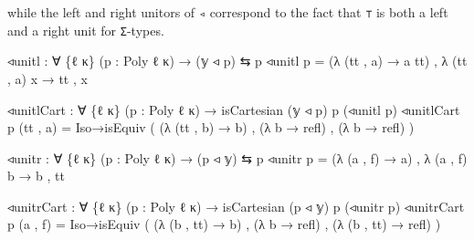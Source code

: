 \documentclass[
  11pt,
  oneside,
  article]{memoir}
\newenvironment{Shaded}{}{}
\newcommand{\NormalTok}[1]{#1}
\newcommand{\OtherTok}[1]{\textcolor[rgb]{0.00,0.44,0.13}{#1}}
\theoremstyle{definition}
\theoremstyle{plain}
\newcommand{\0}{\textsf{0}}
\newcommand{\1}{\tn{\textsf{1}}}
\begin{document}
while the left and right unitors of \texttt{◃} correspond to the fact
that \texttt{⊤} is both a left and a right unit for \texttt{Σ}-types.

\begin{Shaded}
\begin{Highlighting}[]
\NormalTok{◃unitl }\OtherTok{:} \OtherTok{∀} \OtherTok{\{}\NormalTok{ℓ κ}\OtherTok{\}} \OtherTok{(}\NormalTok{p }\OtherTok{:}\NormalTok{ Poly ℓ κ}\OtherTok{)} \OtherTok{→} \OtherTok{(}\NormalTok{𝕪 ◃ p}\OtherTok{)}\NormalTok{ ⇆ p}
\NormalTok{◃unitl p }\OtherTok{=} \OtherTok{(λ} \OtherTok{(}\NormalTok{tt , a}\OtherTok{)} \OtherTok{→}\NormalTok{ a tt}\OtherTok{)}\NormalTok{ , }\OtherTok{λ} \OtherTok{(}\NormalTok{tt , a}\OtherTok{)}\NormalTok{ x }\OtherTok{→}\NormalTok{ tt , x}

\NormalTok{◃unitlCart }\OtherTok{:} \OtherTok{∀} \OtherTok{\{}\NormalTok{ℓ κ}\OtherTok{\}} \OtherTok{(}\NormalTok{p }\OtherTok{:}\NormalTok{ Poly ℓ κ}\OtherTok{)} 
             \OtherTok{→}\NormalTok{ isCartesian }\OtherTok{(}\NormalTok{𝕪 ◃ p}\OtherTok{)}\NormalTok{ p }\OtherTok{(}\NormalTok{◃unitl p}\OtherTok{)}
\NormalTok{◃unitlCart p }\OtherTok{(}\NormalTok{tt , a}\OtherTok{)} \OtherTok{=} 
\NormalTok{    Iso→isEquiv }\OtherTok{(} \OtherTok{(λ} \OtherTok{(}\NormalTok{tt , b}\OtherTok{)} \OtherTok{→}\NormalTok{ b}\OtherTok{)} 
\NormalTok{                , }\OtherTok{(λ}\NormalTok{ b\textquotesingle{} }\OtherTok{→}\NormalTok{ refl}\OtherTok{)} 
\NormalTok{                , }\OtherTok{(λ}\NormalTok{ b\textquotesingle{} }\OtherTok{→}\NormalTok{ refl}\OtherTok{)} \OtherTok{)}

\NormalTok{◃unitr }\OtherTok{:} \OtherTok{∀} \OtherTok{\{}\NormalTok{ℓ κ}\OtherTok{\}} \OtherTok{(}\NormalTok{p }\OtherTok{:}\NormalTok{ Poly ℓ κ}\OtherTok{)} \OtherTok{→} \OtherTok{(}\NormalTok{p ◃ 𝕪}\OtherTok{)}\NormalTok{ ⇆ p}
\NormalTok{◃unitr p }\OtherTok{=} \OtherTok{(λ} \OtherTok{(}\NormalTok{a , f}\OtherTok{)} \OtherTok{→}\NormalTok{ a}\OtherTok{)}\NormalTok{ , }\OtherTok{λ} \OtherTok{(}\NormalTok{a , f}\OtherTok{)}\NormalTok{ b }\OtherTok{→}\NormalTok{ b , tt}

\NormalTok{◃unitrCart }\OtherTok{:} \OtherTok{∀} \OtherTok{\{}\NormalTok{ℓ κ}\OtherTok{\}} \OtherTok{(}\NormalTok{p }\OtherTok{:}\NormalTok{ Poly ℓ κ}\OtherTok{)} 
             \OtherTok{→}\NormalTok{ isCartesian }\OtherTok{(}\NormalTok{p ◃ 𝕪}\OtherTok{)}\NormalTok{ p }\OtherTok{(}\NormalTok{◃unitr p}\OtherTok{)}
\NormalTok{◃unitrCart p }\OtherTok{(}\NormalTok{a , f}\OtherTok{)} \OtherTok{=}
\NormalTok{    Iso→isEquiv }\OtherTok{(} \OtherTok{(λ} \OtherTok{(}\NormalTok{b , tt}\OtherTok{)} \OtherTok{→}\NormalTok{ b}\OtherTok{)} 
\NormalTok{                , }\OtherTok{(λ}\NormalTok{ b }\OtherTok{→}\NormalTok{ refl}\OtherTok{)} 
\NormalTok{                , }\OtherTok{(λ} \OtherTok{(}\NormalTok{b , tt}\OtherTok{)} \OtherTok{→}\NormalTok{ refl}\OtherTok{)} \OtherTok{)}
\end{Highlighting}
\end{Shaded}
\end{document}
